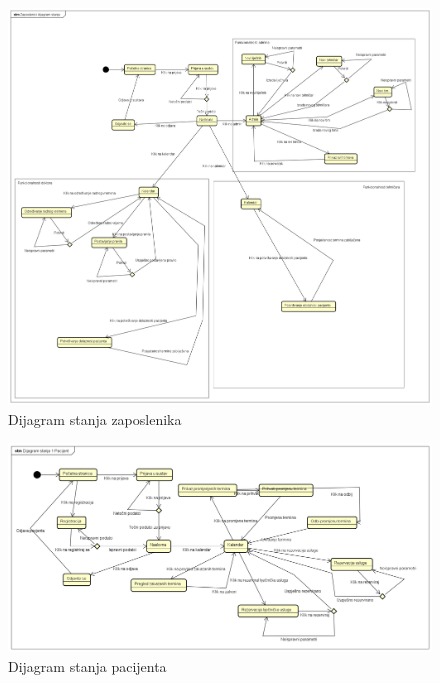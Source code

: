                       \begin{figure}[H]
			            \includegraphics[width=\textwidth]{Zaposlenici.png} %
			          \caption{Dijagram stanja zaposlenika}
			            \label{fig:class2} %
		      \end{figure}

         \begin{figure}[H]
			            \includegraphics[width=\textwidth]{Dijagram stanja 1 Pacijent.png} %
			          \caption{Dijagram stanja pacijenta}
			            \label{fig:class2} %
		      \end{figure}
			
